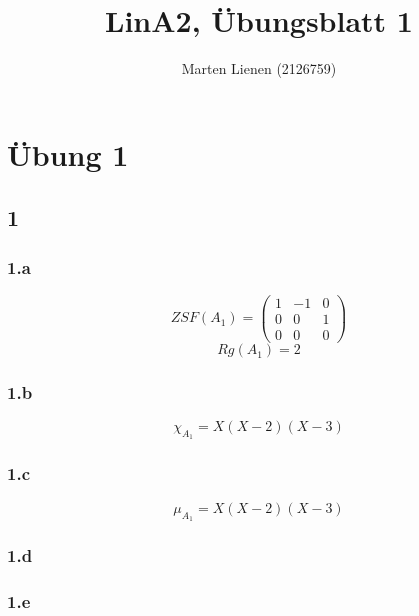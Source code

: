 \documentclass[10pt,a4paper]{article}
\title{LinA2, Übungsblatt 1}
\author{Marten Lienen (2126759)}
\begin{document}
\maketitle

\section*{Übung 1}

\subsection*{1}

\subsubsection*{1.a}

\begin{equation}
ZSF(A_{1}) = 
\begin{pmatrix}
1 & -1 & 0\\
0 & 0 & 1\\
0 & 0 & 0
\end{pmatrix}
\end{equation}
\begin{equation}
Rg(A_{1}) = 2
\end{equation}

\subsubsection*{1.b}

\begin{equation}
\chi_{A_{1}} = X(X-2)(X-3)
\end{equation}

\subsubsection*{1.c}

\begin{equation}
\mu_{A_{1}} = X(X-2)(X-3)
\end{equation}

\subsubsection*{1.d}

\subsubsection*{1.e}
\end{document}
